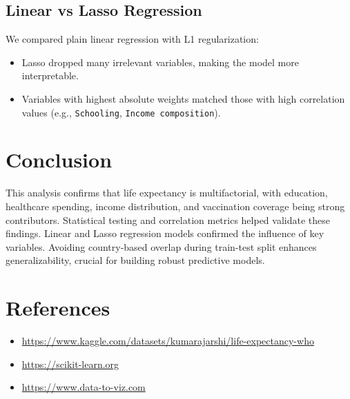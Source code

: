 \documentclass[11pt]{article}
\begin{document}
\subsection{Linear vs Lasso Regression}
We compared plain linear regression with L1 regularization:
\begin{itemize}
    \item Lasso dropped many irrelevant variables, making the model more interpretable.
    \item Variables with highest absolute weights matched those with high correlation values (e.g., \texttt{Schooling}, \texttt{Income composition}).
\end{itemize}

\section{Conclusion}
This analysis confirms that life expectancy is multifactorial, with education, healthcare spending, income distribution, and vaccination coverage being strong contributors. Statistical testing and correlation metrics helped validate these findings. Linear and Lasso regression models confirmed the influence of key variables. Avoiding country-based overlap during train-test split enhances generalizability, crucial for building robust predictive models.

\section*{References}
\begin{itemize}
    \item \url{https://www.kaggle.com/datasets/kumarajarshi/life-expectancy-who}
    \item \url{https://scikit-learn.org}
    \item \url{https://www.data-to-viz.com}
\end{itemize}
\end{document}
